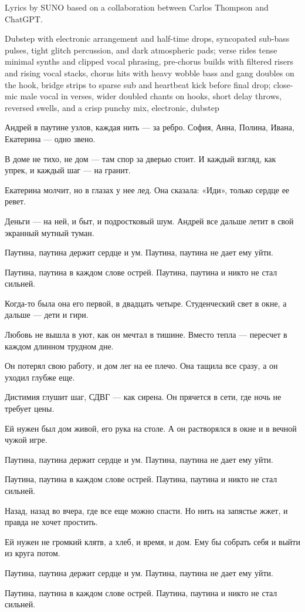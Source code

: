 
\begin{notes}
Lyrics by SUNO based on a collaboration between Carlos Thompson and ChatGPT.
\end{notes}
\begin{style}
Dubstep with electronic arrangement and half-time drops, syncopated sub-bass pulses, tight glitch percussion, and dark atmospheric pads; verse rides tense minimal synths and clipped vocal phrasing, pre-chorus builds with filtered risers and rising vocal stacks, chorus hits with heavy wobble bass and gang doubles on the hook, bridge strips to sparse sub and heartbeat kick before final drop; close-mic male vocal in verses, wider doubled chants on hooks, short delay throws, reversed swells, and a crisp punchy mix, electronic, dubstep
\end{style}
\begin{lyrics}
Андрей в паутине узлов,
каждая нить — за ребро.
София, Анна, Полина,
Ивана, Екатерина — одно звено.

В доме не тихо, не дом —
там спор за дверью стоит.
И каждый взгляд, как упрек,
и каждый шаг — на гранит.

Екатерина молчит,
но в глазах у нее лед.
Она сказала: «Иди»,
только сердце ее ревет.

Деньги — на ней, и быт,
и подростковый шум.
Андрей все дальше летит
в свой экранный мутный туман.

Паутина, паутина
держит сердце и ум.
Паутина, паутина
не дает ему уйти.

Паутина, паутина
в каждом слове острей.
Паутина, паутина
и никто не стал сильней.

Когда-то была она
его первой, в двадцать четыре.
Студенческий свет в окне,
а дальше — дети и гири.

Любовь не вышла в уют,
как он мечтал в тишине.
Вместо тепла — пересчет
в каждом длинном трудном дне.

Он потерял свою работу,
и дом лег на ее плечо.
Она тащила все сразу,
а он уходил глубже еще.

Дистимия глушит шаг,
СДВГ — как сирена.
Он прячется в сети,
где ночь не требует цены.

Ей нужен был дом живой,
его рука на столе.
А он растворялся в окне
и в вечной чужой игре.

Паутина, паутина
держит сердце и ум.
Паутина, паутина
не дает ему уйти.

Паутина, паутина
в каждом слове острей.
Паутина, паутина
и никто не стал сильней.

Назад, назад во вчера,
где все еще можно спасти.
Но нить на запястье жжет,
и правда не хочет простить.

Ей нужен не громкий клятв,
а хлеб, и время, и дом.
Ему бы собрать себя
и выйти из круга потом.

Паутина, паутина
держит сердце и ум.
Паутина, паутина
не дает ему уйти.

Паутина, паутина
в каждом слове острей.
Паутина, паутина
и никто не стал сильней.
\end{lyrics}

